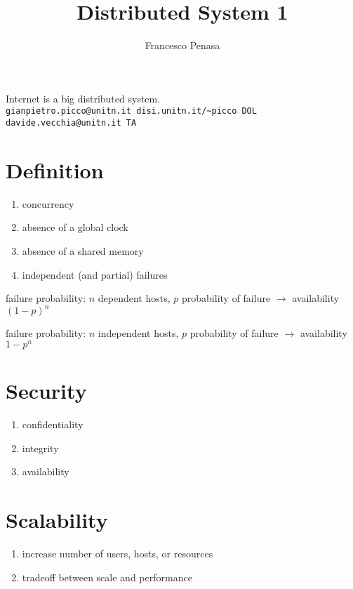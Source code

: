 \documentclass[11pt]{article}
\begin{document}
\author{Francesco Penasa}
\title{Distributed System 1}
\maketitle

\medskip

Internet is a big distributed system. \\
\texttt{gianpietro.picco@unitn.it disi.unitn.it/\~{}picco DOL}\\
\texttt{davide.vecchia@unitn.it TA}


\section{Definition}		
\begin{enumerate}
	\item concurrency
	\item absence of a global clock
	\item absence of a shared memory
	\item independent (and partial) failures
\end{enumerate}

failure probability: $n$ dependent hosts, $p$ probability of failure
$\rightarrow$ availability $(1-p)^n$

failure probability: $n$ independent hosts, $p$ probability of failure
$\rightarrow$ availability $1-p^n$

\section{Security} %
\label{sec:security}
\begin{enumerate}
	\item confidentiality
	\item integrity
	\item availability
\end{enumerate}

\section{Scalability} %
\label{sec:scalability}
\begin{enumerate}
	\item increase number of users, hosts, or resources
	\item tradeoff between scale and performance
\end{enumerate}
\end{document}
